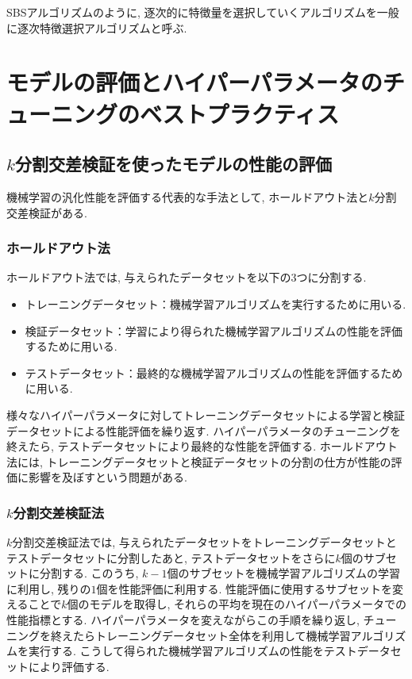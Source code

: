 \documentclass[uplatex]{jsarticle}
\theoremstyle{definition}
\numberwithin{equation}{section}
\begin{document}
SBSアルゴリズムのように, 逐次的に特徴量を選択していくアルゴリズムを一般に逐次特徴選択アルゴリズムと呼ぶ.


\section{モデルの評価とハイパーパラメータのチューニングのベストプラクティス}
\subsection{$k$分割交差検証を使ったモデルの性能の評価}
機械学習の汎化性能を評価する代表的な手法として, ホールドアウト法と$k$分割交差検証がある.

\subsubsection{ホールドアウト法}
ホールドアウト法では, 与えられたデータセットを以下の3つに分割する.
\begin{itemize}
    \item
    トレーニングデータセット：機械学習アルゴリズムを実行するために用いる.

    \item
    検証データセット：学習により得られた機械学習アルゴリズムの性能を評価するために用いる.

    \item
    テストデータセット：最終的な機械学習アルゴリズムの性能を評価するために用いる.
\end{itemize}
様々なハイパーパラメータに対してトレーニングデータセットによる学習と検証データセットによる性能評価を繰り返す.
ハイパーパラメータのチューニングを終えたら, テストデータセットにより最終的な性能を評価する.
ホールドアウト法には, トレーニングデータセットと検証データセットの分割の仕方が性能の評価に影響を及ぼすという問題がある.

\subsubsection{$k$分割交差検証法}
$k$分割交差検証法では, 与えられたデータセットをトレーニングデータセットとテストデータセットに分割したあと, テストデータセットをさらに$k$個のサブセットに分割する.
このうち, $k - 1$個のサブセットを機械学習アルゴリズムの学習に利用し, 残りの$1$個を性能評価に利用する.
性能評価に使用するサブセットを変えることで$k$個のモデルを取得し, それらの平均を現在のハイパーパラメータでの性能指標とする.
ハイパーパラメータを変えながらこの手順を繰り返し, チューニングを終えたらトレーニングデータセット全体を利用して機械学習アルゴリズムを実行する.
こうして得られた機械学習アルゴリズムの性能をテストデータセットにより評価する.
\end{document}
